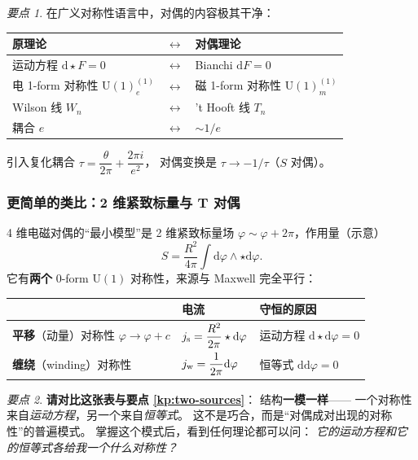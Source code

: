 \documentclass[UTF8,a4paper,11pt]{ctexart}
\theoremstyle{plain}
\theoremstyle{definition}
\theoremstyle{remark}
\newtheorem{keypoint}{要点}[section]
\newcommand{\ext}{\mathrm{d}}          %
\newcommand{\hs}{\star}                %
\newcommand{\Uone}{\mathrm{U}(1)}
\begin{document}
\begin{keypoint}
\label{kp:dualityswaps}
在广义对称性语言中，对偶的内容极其干净：
\begin{center}
\begin{tabular}{@{}lcl@{}}
\toprule
原理论 & $\longleftrightarrow$ & 对偶理论 \\
\midrule
运动方程 $\ext\hs F=0$ & $\longleftrightarrow$ & Bianchi $\ext F=0$ \\
电 1-form 对称性 $\Uone_e^{(1)}$ & $\longleftrightarrow$
  & 磁 1-form 对称性 $\Uone_m^{(1)}$ \\
Wilson 线 $W_n$ & $\longleftrightarrow$ & 't Hooft 线 $T_n$ \\
耦合 $e$ & $\longleftrightarrow$ & $\sim 1/e$ \\
\bottomrule
\end{tabular}
\end{center}
引入复化耦合 $\tau=\dfrac{\theta}{2\pi}+\dfrac{2\pi i}{e^2}$，
对偶变换是 $\tau\to-1/\tau$（$S$ 对偶）。
\end{keypoint}

\subsubsection{更简单的类比：2 维紧致标量与 T 对偶}
\label{subsec:compactscalar}

4 维电磁对偶的“最小模型”是 2 维紧致标量场
$\varphi\sim\varphi+2\pi$，作用量（示意）
\begin{equation}
  S=\frac{R^2}{4\pi}\int \ext\varphi\wedge\hs \ext\varphi .
\end{equation}
它有\textbf{两个} 0-form $\Uone$ 对称性，来源与 Maxwell 完全平行：

\begin{center}
\begin{tabular}{@{}lll@{}}
\toprule
 & 电流 & 守恒的原因 \\
\midrule
\textbf{平移}（动量）对称性 $\varphi\to\varphi+c$
  & $j_{\rm s}=\dfrac{R^2}{2\pi}\hs \ext\varphi$
  & 运动方程 $\ext\hs \ext\varphi=0$ \\[4pt]
\textbf{缠绕}（winding）对称性
  & $j_{\rm w}=\dfrac{1}{2\pi}\ext\varphi$
  & 恒等式 $\ext\ext\varphi=0$ \\
\bottomrule
\end{tabular}
\end{center}

\begin{keypoint}
\label{kp:parallel}
\textbf{请对比这张表与要点 \ref{kp:two-sources}}：
结构\textbf{一模一样}——
一个对称性来自\emph{运动方程}，另一个来自\emph{恒等式}。
这不是巧合，而是“对偶成对出现的对称性”的普遍模式。
掌握这个模式后，看到任何理论都可以问：
\emph{它的运动方程和它的恒等式各给我一个什么对称性？}
\end{keypoint}
\end{document}
